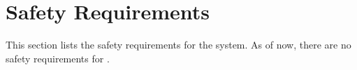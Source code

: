 \KNEADSECTIONNEWPAGE
\section{Safety Requirements}
\label{lab:sec_Safety}
% 

This section lists the safety requirements for the system. As of now, there are no safety requirements for \ThisSys.



% 

